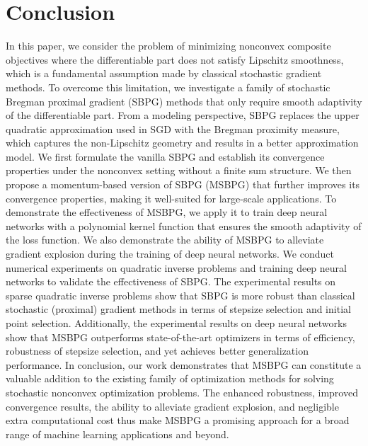\documentclass[twoside,11pt]{article}
\begin{document}
{\section{Conclusion}\label{section-conclusion}
In this paper, we consider the problem of minimizing nonconvex composite objectives where the differentiable part does not satisfy Lipschitz smoothness, which is a fundamental assumption made by classical stochastic gradient methods. To overcome this limitation, we investigate a family of stochastic Bregman proximal gradient (SBPG) methods that only require smooth adaptivity of the differentiable part. From a modeling perspective, SBPG replaces the upper quadratic approximation used in SGD with the Bregman proximity measure, which captures the non-Lipschitz geometry and results in a better approximation model. We first formulate the vanilla SBPG and establish its convergence properties under the nonconvex setting without a finite sum structure. We then propose a momentum-based version of SBPG (MSBPG) that further improves its convergence properties, making it well-suited for large-scale applications. To demonstrate the effectiveness of MSBPG, we apply it to train deep neural networks with a polynomial kernel function that ensures the smooth adaptivity of the loss function. We also demonstrate the ability of MSBPG to alleviate gradient explosion during the training of deep neural networks. We conduct numerical experiments on quadratic inverse problems and training deep neural networks to validate the effectiveness of SBPG. The experimental results on sparse quadratic inverse problems show that SBPG is more robust than classical stochastic (proximal) gradient methods in terms of stepsize selection and initial point selection. Additionally, the experimental results on deep neural networks show that MSBPG outperforms state-of-the-art optimizers in terms of efficiency, robustness of stepsize selection, and yet achieves better generalization performance. In conclusion, our work demonstrates that MSBPG can constitute a valuable addition to the existing family of optimization methods for solving stochastic nonconvex optimization problems. The enhanced robustness, improved convergence results, the ability to alleviate gradient explosion, and negligible extra computational cost thus make MSBPG a promising approach for a broad range of machine learning applications and beyond. 


\appendix
%
}
\end{document}
